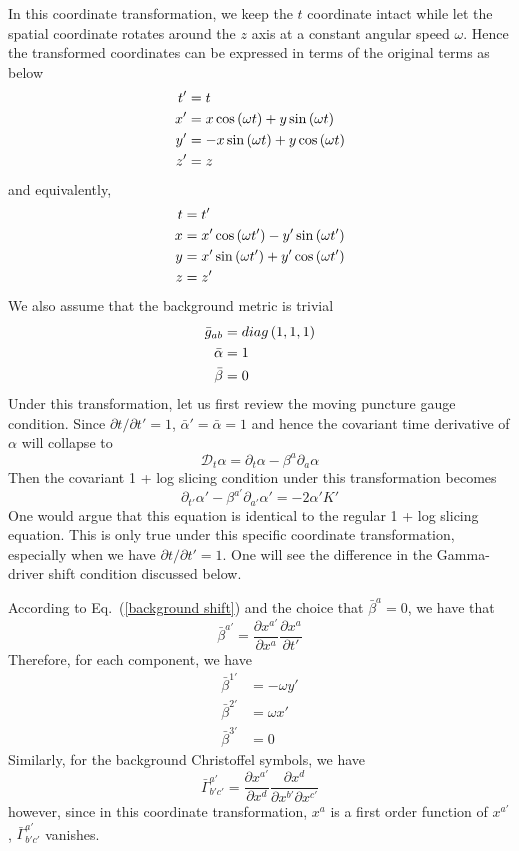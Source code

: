 \documentclass[letterpaper,nofootinbib,prd,amsmath,onecolumn]{revtex4-1}
\begin{document}
In this coordinate transformation, we keep the $t$ coordinate intact while let the spatial coordinate rotates around the $z$ axis at a constant angular speed $\omega$. Hence the transformed coordinates can be expressed in terms of the original terms as below
\begin{align}
t' & = t\notag\\
x' & = x \cos\left(\omega t\right) + y\sin\left(\omega t\right)\notag\\
y' & = -x\sin\left(\omega t\right) + y\cos\left(\omega t\right)\notag\\
z' & = z
\end{align}
and equivalently, 
\begin{align}
t & = t'\notag\\
x & = x'\cos\left(\omega t'\right) - y'\sin\left(\omega t'\right)\notag\\
y & = x'\sin\left(\omega t'\right) + y'\cos\left(\omega t'\right)\notag\\
z & = z'
\end{align}
We also assume that the background metric is trivial
\begin{align}
{\bar g}_{ab} & = diag\left(1,1,1\right)\notag\\
{\bar \alpha} & = 1\notag\\
{\bar \beta} & = 0 
\end{align}
Under this transformation, let us first review the moving puncture gauge condition. Since $\partial t/\partial t' = 1$, ${\bar \alpha}' = {\bar \alpha} = 1$ and hence the covariant time derivative of $\alpha$ will collapse to
\begin{equation}
\mathscr{D}_{t}\alpha = \partial_{t}\alpha - \beta^{a}\partial_{a}\alpha
\end{equation}
Then the covariant 1 + log slicing condition under this transformation becomes
\begin{equation}\label{transformed 1 + log slicing}
\partial_{t'}\alpha' - \beta^{a'}\partial_{a'}\alpha' = -2\alpha'K'
\end{equation}
One would argue that this equation is identical to the regular 1 + log slicing equation. This is only true under this specific coordinate transformation, especially when we have $\partial t/\partial t' = 1$. One will see the difference in the Gamma-driver shift condition discussed below. 

According to Eq.~(\ref{background shift}) and the choice that ${\bar \beta}^{a} = 0$, we have that
\[
{\bar \beta}^{a'} = \frac{\partial x^{a'}}{\partial x^{a}}\frac{\partial x^{a}}{\partial t'}
\]
Therefore, for each component, we have
\begin{align*}
{\bar \beta}^{1'} & = -\omega y'\\
{\bar \beta}^{2'} & = \omega x'\\
{\bar \beta}^{3'} & = 0
\end{align*}
Similarly, for the background Christoffel symbols, we have
\[
{\bar \Gamma}^{a'}_{b'c'} = \frac{\partial x^{a'}}{\partial x^{d}}\frac{\partial x^{d}}{\partial x^{b'}\partial x^{c'}}
\]
however, since in this coordinate transformation, $x^{a}$ is a first order function of $x^{a'}$, ${\bar \Gamma}^{a'}_{b'c'}$ vanishes. 
\end{document}
